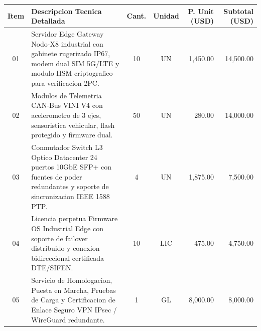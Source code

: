 \documentclass[11pt,a4paper]{article}
\begin{document}
\vspace{1.5mm}

\noindent
\begin{tabularx}{\linewidth}{@{} c p{6.9cm} c c r r @{}}
  \toprule
  \rowcolor{corpPrimary}
  {\bfseries\color{white}\footnotesize Item} &
  {\bfseries\color{white}\footnotesize Descripcion Tecnica Detallada} &
  {\bfseries\color{white}\footnotesize Cant.} &
  {\bfseries\color{white}\footnotesize Unidad} &
  {\bfseries\color{white}\footnotesize P. Unit (USD)} &
  {\bfseries\color{white}\footnotesize Subtotal (USD)} \\
  \midrule
  \rowcolor{corpLightBg}
  01 & Servidor Edge Gateway Nodo-X8 industrial con gabinete rugerizado IP67, modem dual SIM 5G/LTE y modulo HSM criptografico para verificacion 2PC. & 10 & UN & 1,450.00 & 14,500.00 \\
  02 & Modulos de Telemetria CAN-Bus VINI V4 con acelerometro de 3 ejes, sensoristica vehicular, flash protegido y firmware dual. & 50 & UN & 280.00 & 14,000.00 \\
  \rowcolor{corpLightBg}
  03 & Conmutador Switch L3 Optico Datacenter 24 puertos 10GbE SFP+ con fuentes de poder redundantes y soporte de sincronizacion IEEE 1588 PTP. & 4 & UN & 1,875.00 & 7,500.00 \\
  04 & Licencia perpetua Firmware OS Industrial Edge con soporte de failover distribuido y conexion bidireccional certificada DTE/SIFEN. & 10 & LIC & 475.00 & 4,750.00 \\
  \rowcolor{corpLightBg}
  05 & Servicio de Homologacion, Puesta en Marcha, Pruebas de Carga y Certificacion de Enlace Seguro VPN IPsec / WireGuard redundante. & 1 & GL & 8,000.00 & 8,000.00 \\
  \bottomrule
\end{tabularx}

\clearpage

\drawchromaticbar[3.5pt]
\vspace{3mm}


\vspace{3mm}
\end{document}
